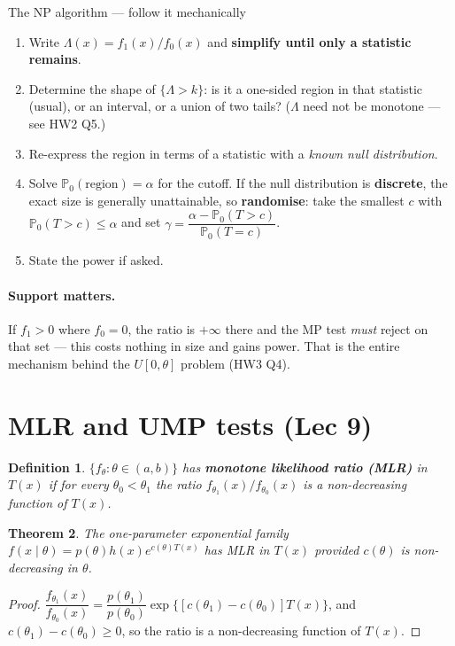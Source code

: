\documentclass[11pt]{article}
\newtheorem{theorem}{Theorem}[section]
\newtheorem{definition}[theorem]{Definition}
\theoremstyle{remark}
\newcommand{\Prob}{\mathbb{P}}
\begin{document}
\begin{recipebox}{The NP algorithm --- follow it mechanically}
\begin{enumerate}
\item Write $\Lambda(x)=f_1(x)/f_0(x)$ and \textbf{simplify until only a statistic remains}.
\item Determine the shape of $\{\Lambda>k\}$: is it a one-sided region in that statistic
(usual), or an interval, or a union of two tails? ($\Lambda$ need not be monotone --- see HW2 Q5.)
\item Re-express the region in terms of a statistic with a \emph{known null distribution}.
\item Solve $\Prob_{0}(\text{region})=\alpha$ for the cutoff. If the null distribution is
\textbf{discrete}, the exact size is generally unattainable, so \textbf{randomise}: take the
smallest $c$ with $\Prob_0(T>c)\le\alpha$ and set
$\gamma=\dfrac{\alpha-\Prob_0(T>c)}{\Prob_0(T=c)}$.
\item State the power if asked.
\end{enumerate}
\end{recipebox}

\paragraph{Support matters.} If $f_1>0$ where $f_0=0$, the ratio is $+\infty$ there and the MP
test \emph{must} reject on that set --- this costs nothing in size and gains power. That is the
entire mechanism behind the $U[0,\theta]$ problem (HW3 Q4).

\section{MLR and UMP tests (Lec 9)}

\begin{definition}
$\{f_\theta:\theta\in(a,b)\}$ has \textbf{monotone likelihood ratio (MLR)} in $T(x)$ if for
every $\theta_0<\theta_1$ the ratio $f_{\theta_1}(x)/f_{\theta_0}(x)$ is a non-decreasing
function of $T(x)$.
\end{definition}

\begin{theorem}
The one-parameter exponential family $f(x\mid\theta)=p(\theta)h(x)e^{c(\theta)T(x)}$ has MLR
in $T(x)$ provided $c(\theta)$ is non-decreasing in $\theta$.
\end{theorem}
\begin{proof}
$\dfrac{f_{\theta_1}(x)}{f_{\theta_0}(x)}=\dfrac{p(\theta_1)}{p(\theta_0)}
\exp\{[c(\theta_1)-c(\theta_0)]T(x)\}$, and $c(\theta_1)-c(\theta_0)\ge0$, so the ratio is a
non-decreasing function of $T(x)$.
\end{proof}
\end{document}
